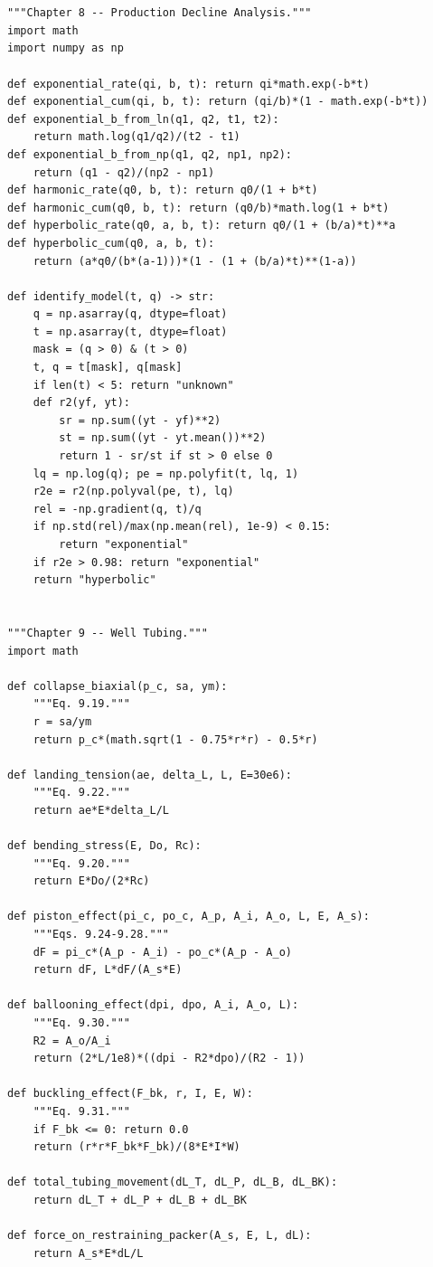 \documentclass[10pt,a4paper,openany]{book}
\begin{document}
\chapter{}
\begin{lstlisting}
"""Chapter 8 -- Production Decline Analysis."""
import math
import numpy as np

def exponential_rate(qi, b, t): return qi*math.exp(-b*t)
def exponential_cum(qi, b, t): return (qi/b)*(1 - math.exp(-b*t))
def exponential_b_from_ln(q1, q2, t1, t2):
    return math.log(q1/q2)/(t2 - t1)
def exponential_b_from_np(q1, q2, np1, np2):
    return (q1 - q2)/(np2 - np1)
def harmonic_rate(q0, b, t): return q0/(1 + b*t)
def harmonic_cum(q0, b, t): return (q0/b)*math.log(1 + b*t)
def hyperbolic_rate(q0, a, b, t): return q0/(1 + (b/a)*t)**a
def hyperbolic_cum(q0, a, b, t):
    return (a*q0/(b*(a-1)))*(1 - (1 + (b/a)*t)**(1-a))

def identify_model(t, q) -> str:
    q = np.asarray(q, dtype=float)
    t = np.asarray(t, dtype=float)
    mask = (q > 0) & (t > 0)
    t, q = t[mask], q[mask]
    if len(t) < 5: return "unknown"
    def r2(yf, yt):
        sr = np.sum((yt - yf)**2)
        st = np.sum((yt - yt.mean())**2)
        return 1 - sr/st if st > 0 else 0
    lq = np.log(q); pe = np.polyfit(t, lq, 1)
    r2e = r2(np.polyval(pe, t), lq)
    rel = -np.gradient(q, t)/q
    if np.std(rel)/max(np.mean(rel), 1e-9) < 0.15:
        return "exponential"
    if r2e > 0.98: return "exponential"
    return "hyperbolic"
\end{lstlisting}

\chapter{}
\begin{lstlisting}
"""Chapter 9 -- Well Tubing."""
import math

def collapse_biaxial(p_c, sa, ym):
    """Eq. 9.19."""
    r = sa/ym
    return p_c*(math.sqrt(1 - 0.75*r*r) - 0.5*r)

def landing_tension(ae, delta_L, L, E=30e6):
    """Eq. 9.22."""
    return ae*E*delta_L/L

def bending_stress(E, Do, Rc):
    """Eq. 9.20."""
    return E*Do/(2*Rc)

def piston_effect(pi_c, po_c, A_p, A_i, A_o, L, E, A_s):
    """Eqs. 9.24-9.28."""
    dF = pi_c*(A_p - A_i) - po_c*(A_p - A_o)
    return dF, L*dF/(A_s*E)

def ballooning_effect(dpi, dpo, A_i, A_o, L):
    """Eq. 9.30."""
    R2 = A_o/A_i
    return (2*L/1e8)*((dpi - R2*dpo)/(R2 - 1))

def buckling_effect(F_bk, r, I, E, W):
    """Eq. 9.31."""
    if F_bk <= 0: return 0.0
    return (r*r*F_bk*F_bk)/(8*E*I*W)

def total_tubing_movement(dL_T, dL_P, dL_B, dL_BK):
    return dL_T + dL_P + dL_B + dL_BK

def force_on_restraining_packer(A_s, E, L, dL):
    return A_s*E*dL/L
\end{lstlisting}
\end{document}
